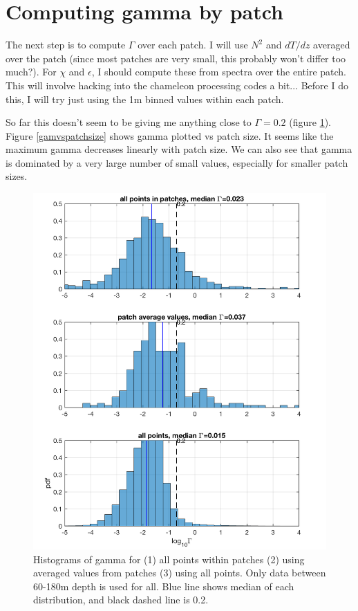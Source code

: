 \documentclass[11pt]{article}
\begin{document}
\clearpage
\section{Computing gamma by patch}

The next step is to compute $\Gamma$ over each patch. I will use $N^2$ and $dT/dz$ averaged over the patch (since most patches are very small, this probably won't differ too much?). For $\chi$ and $\epsilon$, I should compute these from spectra over the entire patch. This will involve hacking into the chameleon processing codes a bit... Before I do this, I will try just using the 1m binned values within each patch.

So far this doesn't seem to be giving me anything close to $\Gamma=0.2$ (figure \ref{hists_gamma_allVspatch}). Figure \ref{gamvspatchsize} shows gamma plotted vs patch size. It seems like the maximum gamma decreases linearly with patch size. We can also see that gamma is dominated by a very large number of small values, especially for smaller patch sizes.

\begin{figure}[htbp]
\includegraphics[scale=0.8]{hists_gamma_allVspatch.png}
\caption{Histograms of gamma for (1) all points within patches (2) using averaged values from patches (3) using all points. Only data between 60-180m depth is used for all.  Blue line shows median of each distribution, and black dashed line is 0.2.}
\label{hists_gamma_allVspatch}
\end{figure}
\end{document}
